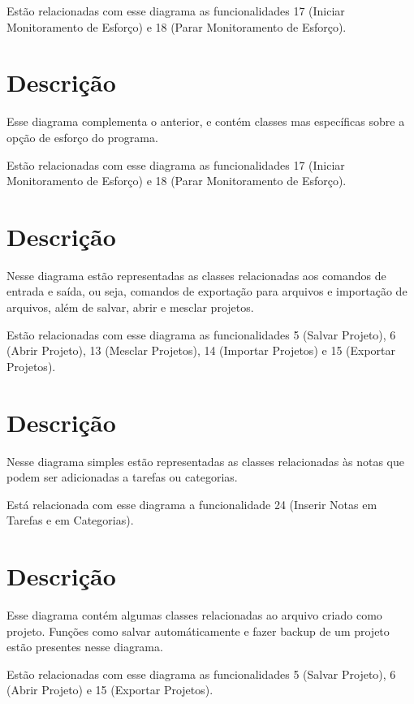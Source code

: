 	Estão relacionadas com esse diagrama as funcionalidades 17 (Iniciar Monitoramento de Esforço) e 18 (Parar Monitoramento de Esforço).

\section{Descrição}
	Esse diagrama complementa o anterior, e contém classes mas específicas sobre a opção de esforço do programa.
	
	Estão relacionadas com esse diagrama as funcionalidades 17 (Iniciar Monitoramento de Esforço) e 18 (Parar Monitoramento de Esforço). 

\section{Descrição}
	Nesse diagrama estão representadas as classes relacionadas aos comandos de entrada e saída, ou seja, comandos de exportação para arquivos e importação de arquivos, além de salvar, abrir e mesclar projetos.
	
	Estão relacionadas com esse diagrama as funcionalidades 5 (Salvar Projeto), 6 (Abrir Projeto), 13 (Mesclar Projetos), 14 (Importar Projetos) e 15 (Exportar Projetos).

\section{Descrição}
	Nesse diagrama simples estão representadas as classes relacionadas às notas que podem ser adicionadas a tarefas ou categorias.
	
	Está relacionada com esse diagrama a funcionalidade 24 (Inserir Notas em Tarefas e em Categorias).

\section{Descrição}
	Esse diagrama contém algumas classes relacionadas ao arquivo criado como projeto. Funções como salvar automáticamente e fazer backup de um projeto estão presentes nesse diagrama.
	
	Estão relacionadas com esse diagrama as funcionalidades 5 (Salvar Projeto), 6 (Abrir Projeto) e 15 (Exportar Projetos).


